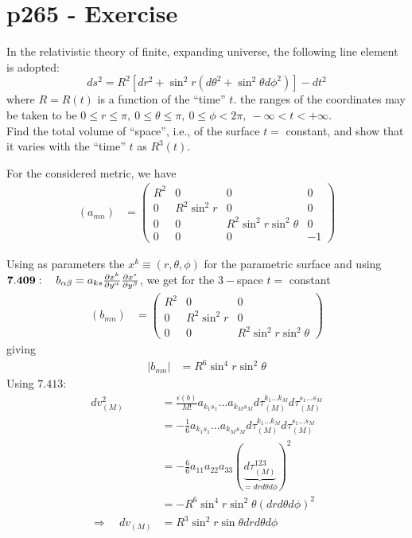 \section{p265 - Exercise}
\begin{tcolorbox}
In the relativistic theory of finite, expanding universe, the following line element is adopted:
$$ds^2=R^2\left[dr^2+\sin^2 r\left(d\theta^2+\sin^2\theta d\phi^2\right)\right]-dt^2$$
where $R=R(t)$ is a function of the ``time'' $t$. the ranges of the coordinates may be taken to be $0\leq r\leq \pi, \ 0 \leq \theta \leq \pi,\ 0 \leq \phi< 2\pi,\ -\infty < t < + \infty$.\\
Find the total volume of ``space'', i.e., of the surface $t=$ constant, and show that it varies with the ``time'' $t$ as $R^3(t)$.
\end{tcolorbox}
For the considered metric, we have
\begin{align}
\left(a_{mn}\right)&= \left(\begin{array}{llll}
R^2&0&0&0\\
0&R^2\sin^2r&0&0\\
0&0&R^2\sin^2 r\sin^2\theta&0\\
0&0&0&-1
\end{array}\right)
\end{align}

Using as parameters the $x^k \equiv(r,\theta,\phi)$ for the parametric surface and using $\mathbf{7.409}:\quad b_{\alpha\beta}= a_{ks}\pdv{x^k}{y^{\alpha}}\pdv{x^s}{y^{\beta}} $, we get for the $3-$space $t=$ constant
\begin{align}
\left(b_{mn}\right)&= \left(\begin{array}{lll}
R^2&0&0\\
0&R^2\sin^2r&0\\
0&0&R^2\sin^2 r\sin^2\theta
\end{array}\right)
\end{align}
giving 
\begin{align}
\left|b_{mn}\right| &= R^6\sin^4 r\sin^2\theta
\end{align}
Using $\mathbf{7.413}$:
\begin{align}
dv_{(M)}^2&= \frac{\epsilon (b)}{M!}a_{k_1s_1}\dots a_{k_M s_M}d\tau_{(M)}^{k_1\dots k_M}d\tau_{(M)}^{s_1\dots s_M}\\
&= -\frac{1}{6}a_{k_1s_1}\dots a_{k_M s_M}d\tau_{(M)}^{k_1\dots k_M}d\tau_{(M)}^{s_1\dots s_M}\\
&= -\frac{6}{6}a_{11}a_{22}a_{33}\left(\underbrace{d\tau_{(M)}^{123}}_{=dr d\theta d\phi} \right)^2\\
&= -R^6\sin^4 r\sin^2\theta\left(dr d\theta d\phi \right)^2\\
\Rightarrow \quad dv_{(M)}&=R^3\sin^2 r\sin\theta dr d\theta d\phi
\end{align}


